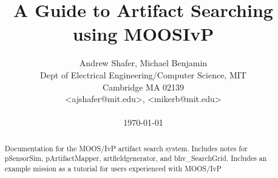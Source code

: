 \documentclass[conference]{IEEEtran}
\begin{document}
\newcommand{\email}[1]{\textless #1\textgreater}
\newcommand{\img}[4][width=\linewidth]
{
\begin{figure}[ht]
\centering
\texttt{[image: \#2]}
\caption{#3}
\label{#4}
\end{figure}
}
\newcommand{\bhvsg}{bhv\_SearchGrid}

\newlength{\pin}
\setlength{\pin}{0.2in}
\newenvironment{hangpar}[1]{\list{}{
    \setlength{\listparindent}{1.5em}       \setlength{\itemindent}{0pt}
    \setlength{\itemsep}{0pt}               \setlength{\parindent}{0pt}
    \setlength{\rightmargin}{0pt}           \setlength{\leftmargin}{#1}
               \parsep                                 \medskipamount}%
    \item\hspace{-\leftmargin}\noindent\ignorespaces}
    {\endlist}


\title{A Guide to Artifact Searching using MOOSIvP}


\author{Andrew Shafer, Michael Benjamin \\
Dept of Electrical Engineering/Computer Science, MIT \\
Cambridge MA 02139 \\
\email{ajshafer@mit.edu}, \email{mikerb@mit.edu} \\ \\
{\Large{\today}}}
\maketitle



\begin{abstract}
Documentation for the MOOS/IvP artifact search system.  Includes notes for pSensorSim, pArtifactMapper, artfieldgenerator, and \bhvsg.  Includes an example mission as a tutorial for users experienced with MOOS/IvP
\end{abstract}











\small
 


\newpage
\appendices

%
%
\end{document}
